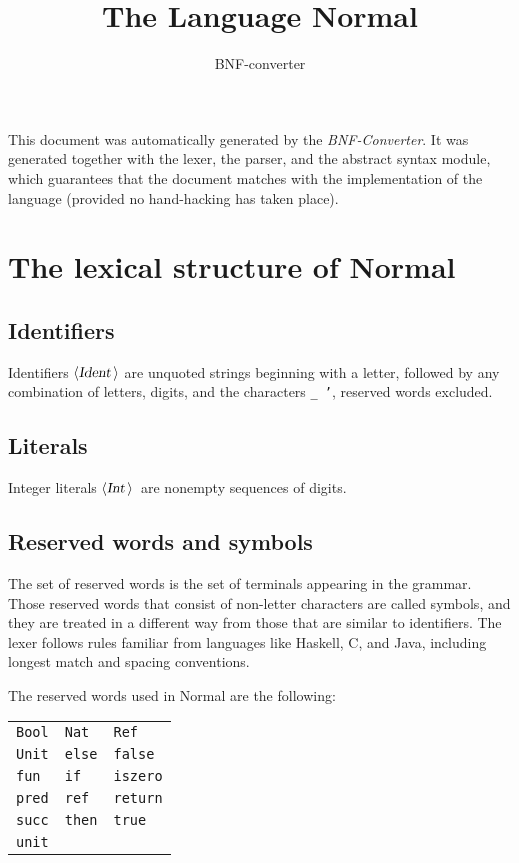 \documentclass[a4paper,11pt]{article}
\title{The Language Normal}
\author{BNF-converter}
\begin{document}
\maketitle


\newcommand{\emptyP}{\mbox{$\epsilon$}}
\newcommand{\terminal}[1]{\mbox{{\texttt {#1}}}}
\newcommand{\nonterminal}[1]{\mbox{$\langle \mbox{{\sl #1 }} \! \rangle$}}
\newcommand{\arrow}{\mbox{::=}}
\newcommand{\delimit}{\mbox{$|$}}
\newcommand{\reserved}[1]{\mbox{{\texttt {#1}}}}
\newcommand{\literal}[1]{\mbox{{\texttt {#1}}}}
\newcommand{\symb}[1]{\mbox{{\texttt {#1}}}}

This document was automatically generated by the {\em BNF-Converter}.
It was generated together with the lexer, the parser, and the
abstract syntax module, which guarantees that the document
matches with the implementation of the language
(provided no hand-hacking has taken place).

\section*{The lexical structure of Normal}

\subsection*{Identifiers}
Identifiers \nonterminal{Ident} are unquoted strings beginning with a letter,
followed by any combination of letters, digits, and the characters {\tt \_ '},
reserved words excluded.
\subsection*{Literals}
Integer literals \nonterminal{Int}\ are nonempty sequences of digits.

\subsection*{Reserved words and symbols}
The set of reserved words is the set of terminals appearing in the grammar. Those reserved words that consist of non-letter characters are called symbols, and they are treated in a different way from those that are similar to identifiers. The lexer follows rules familiar from languages like Haskell, C, and Java, including longest match and spacing conventions.

The reserved words used in Normal are the following: \\

\begin{tabular}{lll}
{\reserved{Bool}} &{\reserved{Nat}} &{\reserved{Ref}} \\
{\reserved{Unit}} &{\reserved{else}} &{\reserved{false}} \\
{\reserved{fun}} &{\reserved{if}} &{\reserved{iszero}} \\
{\reserved{pred}} &{\reserved{ref}} &{\reserved{return}} \\
{\reserved{succ}} &{\reserved{then}} &{\reserved{true}} \\
{\reserved{unit}} & & \\
\end{tabular}\\
\end{document}
